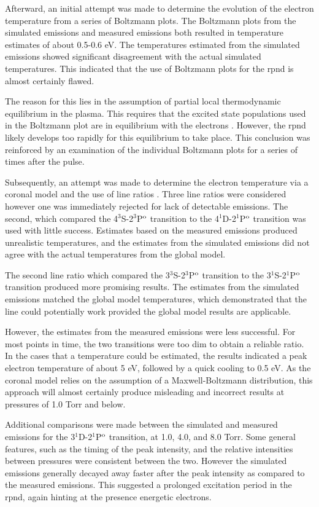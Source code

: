 Afterward, an initial attempt was made to determine the evolution of the
electron temperature from a series of Boltzmann plots. The Boltzmann plots from
the simulated emissions and measured emissions both resulted in temperature
estimates of about 0.5-0.6 eV. The temperatures estimated from the simulated
emissions showed significant disagreement with the actual simulated
temperatures. This indicated that the use of Boltzmann plots for the \acs{rpnd}
is almost certainly flawed.

The reason for this lies in the assumption of partial local thermodynamic
equilibrium in the plasma. This requires that the excited state populations used
in the Boltzmann plot are in equilibrium with the electrons \cite{Kunze2009}.
However, the \acs{rpnd} likely develops too rapidly for this equilibrium to take
place. This conclusion was reinforced by an examination of the individual
Boltzmann plots for a series of times after the pulse.

Subsequently, an attempt was made to determine the electron temperature via a
coronal model and the use of line ratios \cite{Griem2005}. Three line ratios
were considered however one was immediately rejected for lack of detectable
emissions. The second, which compared the 4$^3$S-2$^3$P$^\mathrm{o}$ transition to the
4$^1$D-2$^1$P$^\mathrm{o}$ transition was used with little success. Estimates based on
the measured emissions produced unrealistic temperatures, and the estimates from
the simulated emissions did not agree with the actual temperatures from the
global model.

The second line ratio which compared the 3$^3$S-2$^3$P$^\mathrm{o}$ transition to the
3$^1$S-2$^1$P$^\mathrm{o}$ transition produced more promising results. The estimates
from the simulated emissions matched the global model temperatures, which
demonstrated that the line could potentially work provided the global model
results are applicable.

However, the estimates from the measured emissions were less successful. For
most points in time, the two transitions were too dim to obtain a reliable
ratio. In the cases that a temperature could be estimated, the results indicated
a peak electron temperature of about 5 eV, followed by a quick cooling to 0.5
eV. As the coronal model relies on the assumption of a Maxwell-Boltzmann
distribution, this approach will almost certainly produce misleading and
incorrect results at pressures of 1.0 Torr and below.

Additional comparisons were made between the simulated and measured emissions
for the 3$^1$D-2$^1$P$^\mathrm{o}$ transition, at 1.0, 4.0, and 8.0 Torr. Some general
features, such as the timing of the peak intensity, and the relative intensities
between pressures were consistent between the two. However the simulated
emissions generally decayed away faster after the peak intensity as compared to
the measured emissions. This suggested a prolonged excitation period in the
\acs{rpnd}, again hinting at the presence energetic electrons.

